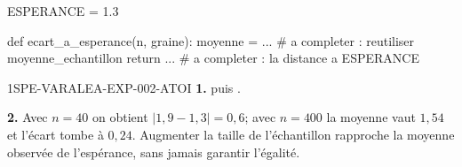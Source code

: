 \begin{python}
ESPERANCE = 1.3

def ecart_a_esperance(n, graine):
    moyenne = ...          # a completer : reutiliser moyenne_echantillon
    return ...             # a completer : la distance a ESPERANCE
\end{python}

\ifnxVersionProfesseur
\begin{corrige}{1SPE-VARALEA-EXP-002-ATOI}
\textbf{1.}  puis
.

\textbf{2.} Avec $n=40$ on obtient $\lvert 1{,}9-1{,}3\rvert = 0{,}6$; avec
$n=400$ la moyenne vaut $1{,}54$ et l'écart tombe à $0{,}24$. Augmenter la taille de l'échantillon
rapproche la moyenne observée de l'espérance, sans jamais garantir l'égalité.
\end{corrige}
\fi

